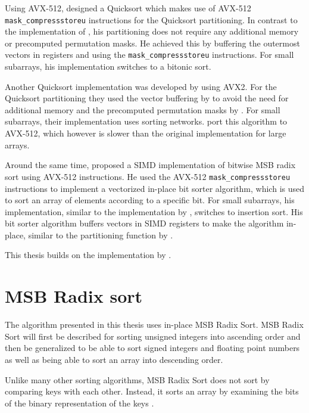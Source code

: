 \documentclass[12pt, a4paper, openright, twoside]{tiarbeit}
\begin{document}
Using AVX-512, \citet{bramas} designed a Quicksort which makes use of
AVX-512 \texttt{mask\_compressstoreu} instructions for the Quicksort partitioning.
In contrast to the implementation of \citet{fast_quicksort_gueron_krasnov},
his partitioning does not require any additional
memory or precomputed permutation masks. He achieved this by buffering the
outermost vectors in registers and using the
\texttt{mask\_compressstoreu} instructions.
For small subarrays, his implementation switches to a bitonic sort.

Another Quicksort implementation was developed by \citet{blacher} using
AVX2. For the Quicksort partitioning they used the vector buffering by
\citet{bramas} to avoid the need for additional memory
and the precomputed permutation masks by \citet{fast_quicksort_gueron_krasnov}.
For small subarrays, their implementation uses sorting networks.
\citet{blacher_using_avx512_thiemicke} port this algorithm to AVX-512, which
however is slower than the original implementation for large arrays.

Around the same time, \citet{moeller_radix} proposed a SIMD implementation of
bitwise MSB radix sort using AVX-512 instructions.
He used the AVX-512 \texttt{mask\_compressstoreu}
instructions to implement a vectorized in-place bit sorter algorithm, which
is used to sort an array of elements according to a specific bit.
For small subarrays, his implementation, similar to the implementation by
\citet{fast_quicksort_gueron_krasnov}, switches to insertion sort.
His bit sorter algorithm buffers vectors in SIMD registers to make the algorithm
in-place, similar to the partitioning function by \citet{bramas}.

This thesis builds on the implementation by \citet{moeller_radix}.


\chapter{MSB Radix sort}\label{chap:radix_sort}

The algorithm presented in this thesis uses in-place MSB Radix Sort.
MSB Radix Sort will first be described for sorting unsigned integers into
ascending order and then be generalized to be able to sort signed integers
and floating point numbers as well as being able to sort an array into
descending order.

Unlike many other sorting algorithms, MSB Radix Sort does not sort by comparing keys
with each other. Instead, it sorts an array
by examining the bits of the binary representation of the keys
\citep[pp. 122-123]{knuth_taocp}.
\end{document}
